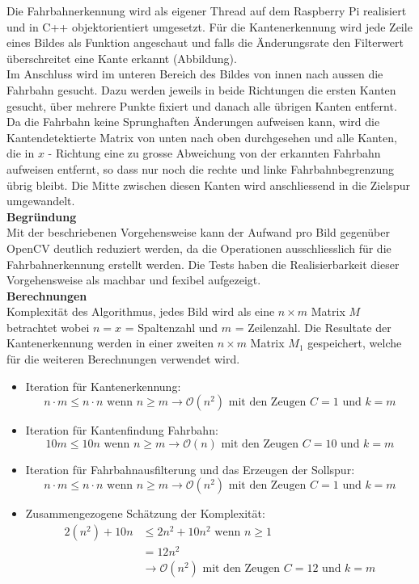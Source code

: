 Die Fahrbahnerkennung wird als eigener Thread auf dem Raspberry Pi realisiert und in C++ objektorientiert umgesetzt. Für die Kantenerkennung wird jede Zeile eines Bildes als Funktion angeschaut und falls die Änderungsrate den Filterwert überschreitet eine Kante erkannt (Abbildung). \\
Im Anschluss wird im unteren Bereich des Bildes von innen nach aussen die Fahrbahn gesucht. Dazu werden jeweils in beide Richtungen die ersten Kanten gesucht, über mehrere Punkte fixiert und danach alle übrigen Kanten entfernt.\\
Da die Fahrbahn keine Sprunghaften Änderungen aufweisen kann, wird die Kantendetektierte Matrix von unten nach oben durchgesehen und alle Kanten, die in $x$ - Richtung eine zu grosse Abweichung von der erkannten Fahrbahn aufweisen entfernt, so dass nur noch die rechte und linke Fahrbahnbegrenzung übrig bleibt. Die Mitte zwischen diesen Kanten wird anschliessend in die Zielspur umgewandelt.\\
\textbf{Begründung}\\
Mit der beschriebenen Vorgehensweise kann der Aufwand pro Bild gegenüber OpenCV deutlich reduziert werden, da die Operationen ausschliesslich für die Fahrbahnerkennung erstellt werden. Die Tests haben die Realisierbarkeit dieser Vorgehensweise als machbar und fexibel aufgezeigt.\\
\textbf{Berechnungen}\\
Komplexität des Algorithmus, jedes Bild wird als eine $n\times{m}$ Matrix $M$ betrachtet wobei $n=x$ = Spaltenzahl und $m$ = Zeilenzahl. Die Resultate der Kantenerkennung werden in einer zweiten $n\times{m}$ Matrix $M_1$ gespeichert, welche für die weiteren Berechnungen verwendet wird.
\begin{itemize}
\item Iteration für Kantenerkennung:
\[
n \cdot m \leq n \cdot n \text{ wenn } n\geq m \rightarrow \mathcal{O}(n^2) \text{ mit den Zeugen }C=1 \text{ und } k = m
\]
\item Iteration für Kantenfindung Fahrbahn:
\[
10m \leq 10n  \text{ wenn } n\geq m \rightarrow \mathcal{O}(n) \text{ mit den Zeugen }C=10 \text{ und } k = m
\]
\item Iteration für Fahrbahnausfilterung und das Erzeugen der Sollspur:
\[
n \cdot m \leq n \cdot n \text{ wenn } n\geq m \rightarrow \mathcal{O}(n^2) \text{ mit den Zeugen }C=1 \text{ und } k = m
\]
\item Zusammengezogene Schätzung der Komplexität:
\begin{align*}
2(n^2) + 10n &\leq 2n^2 + 10n^2 \text{ wenn } n\geq 1\\
             &= 12n^2\\
             &\rightarrow \mathcal{O}(n^2) \text{ mit den Zeugen }C=12 \text{ und } k = m
\end{align*}
\end{itemize}
